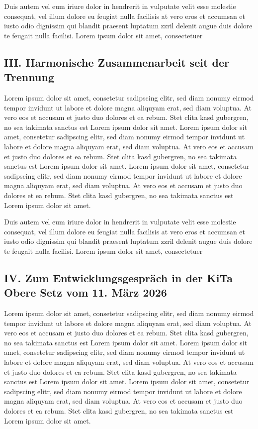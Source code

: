 \documentclass[
  12pt,
  a4paper,
]{article}
\begin{document}
Duis autem vel eum iriure dolor in hendrerit in vulputate velit esse
molestie consequat, vel illum dolore eu feugiat nulla facilisis at vero
eros et accumsan et iusto odio dignissim qui blandit praesent luptatum
zzril delenit augue duis dolore te feugait nulla facilisi. Lorem ipsum
dolor sit amet, consectetuer

\subsection{III. Harmonische Zusammenarbeit seit der
Trennung}\label{iii.-harmonische-zusammenarbeit-seit-der-trennung}

Lorem ipsum dolor sit amet, consetetur sadipscing elitr, sed diam nonumy
eirmod tempor invidunt ut labore et dolore magna aliquyam erat, sed diam
voluptua. At vero eos et accusam et justo duo dolores et ea rebum. Stet
clita kasd gubergren, no sea takimata sanctus est Lorem ipsum dolor sit
amet. Lorem ipsum dolor sit amet, consetetur sadipscing elitr, sed diam
nonumy eirmod tempor invidunt ut labore et dolore magna aliquyam erat,
sed diam voluptua. At vero eos et accusam et justo duo dolores et ea
rebum. Stet clita kasd gubergren, no sea takimata sanctus est Lorem
ipsum dolor sit amet. Lorem ipsum dolor sit amet, consetetur sadipscing
elitr, sed diam nonumy eirmod tempor invidunt ut labore et dolore magna
aliquyam erat, sed diam voluptua. At vero eos et accusam et justo duo
dolores et ea rebum. Stet clita kasd gubergren, no sea takimata sanctus
est Lorem ipsum dolor sit amet.

Duis autem vel eum iriure dolor in hendrerit in vulputate velit esse
molestie consequat, vel illum dolore eu feugiat nulla facilisis at vero
eros et accumsan et iusto odio dignissim qui blandit praesent luptatum
zzril delenit augue duis dolore te feugait nulla facilisi. Lorem ipsum
dolor sit amet, consectetuer

\subsection{IV. Zum Entwicklungsgespräch in der KiTa Obere Setz vom 11.
März
2026}\label{iv.-zum-entwicklungsgespruxe4ch-in-der-kita-obere-setz-vom-11.-muxe4rz-2026}

Lorem ipsum dolor sit amet, consetetur sadipscing elitr, sed diam nonumy
eirmod tempor invidunt ut labore et dolore magna aliquyam erat, sed diam
voluptua. At vero eos et accusam et justo duo dolores et ea rebum. Stet
clita kasd gubergren, no sea takimata sanctus est Lorem ipsum dolor sit
amet. Lorem ipsum dolor sit amet, consetetur sadipscing elitr, sed diam
nonumy eirmod tempor invidunt ut labore et dolore magna aliquyam erat,
sed diam voluptua. At vero eos et accusam et justo duo dolores et ea
rebum. Stet clita kasd gubergren, no sea takimata sanctus est Lorem
ipsum dolor sit amet. Lorem ipsum dolor sit amet, consetetur sadipscing
elitr, sed diam nonumy eirmod tempor invidunt ut labore et dolore magna
aliquyam erat, sed diam voluptua. At vero eos et accusam et justo duo
dolores et ea rebum. Stet clita kasd gubergren, no sea takimata sanctus
est Lorem ipsum dolor sit amet.
\end{document}
